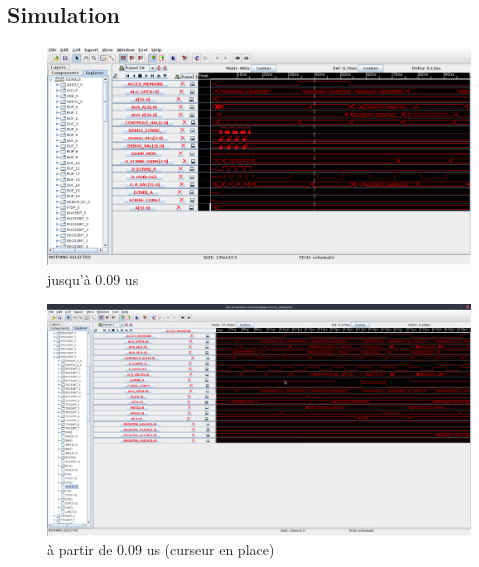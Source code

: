 \documentclass{article}
\begin{document}
\newpage
\subsection*{Simulation}
\begin{figure}[!ht]
	\centering
	\includegraphics[width=1\textwidth]{e1-q3-p3.png}
	\caption{jusqu'\`a 0.09 us}
	\label{}
\end{figure}
\begin{figure}[!hb]
	\centering
	\includegraphics[width=1\textwidth]{e1-q3-p1.png}
	\caption{\`a partir de 0.09 us (curseur en place)}
	\label{}
\end{figure}

\newpage
\end{document}
